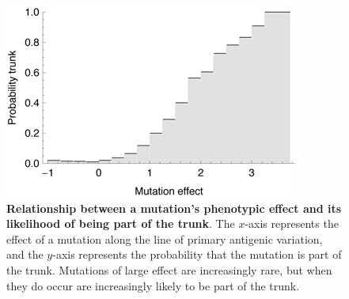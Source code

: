 \documentclass[11pt,oneside,letterpaper]{article}
\begin{document}
\vspace*{\fill}
\begin{figure}[H]
	\centering
	\includegraphics{figures/probtrunk}
	\caption{\textbf{Relationship between a mutation's phenotypic effect and its likelihood of being part of the trunk}. The $x$-axis represents the effect of a mutation along the line of primary antigenic variation, and the $y$-axis represents the probability that the mutation is part of the trunk.  Mutations of large effect are increasingly rare, but when they do occur are increasingly likely to be part of the trunk.}
	\label{probtrunk}
\end{figure}
\vspace*{\fill}

\pagebreak
\end{document}
